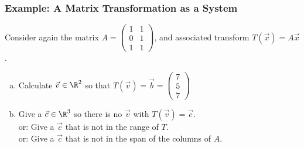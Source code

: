 \begin{frame}


\frametitle{Example: A Matrix Transformation as a System}

Consider again the matrix $A=\begin{pmatrix} 1&1\\0&1\\1&1 \end{pmatrix}$, and associated transform $T(\vec x) = A\vec x $.

\begin{enumerate}[a)]
    
    \item Calculate $\vec v \in \R^2$ so that $T(\vec v)= \vec b =\begin{pmatrix} 7\\5\\7\end{pmatrix}$ \vfill
    \item Give a $\vec c \in \R^3$ so there is no $\vec v$ with $T(\vec v)= \vec c$. \\ 
    or: Give a $\vec c$ that is not in the range of $T$. \\
    or: Give a $\vec c$ that is not in the span of the columns of $A$.

\end{enumerate} 

\end{frame}







